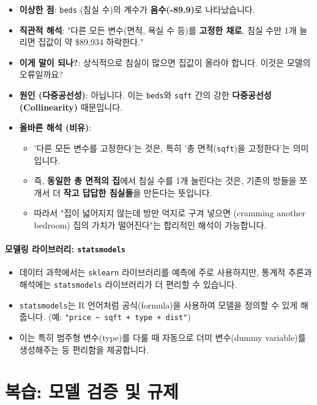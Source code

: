 \documentclass[11pt,a4paper]{book}
\theoremstyle{definition}
\begin{document}
\begin{itemize}
    \item \textbf{이상한 점}: \texttt{beds} (침실 수)의 계수가 \textbf{음수(-89.9)}로 나타났습니다.
    \item \textbf{직관적 해석}: "다른 모든 변수(면적, 욕실 수 등)를 \textbf{고정한 채로}, 침실 수만 1개 늘리면 집값이 약 \$89,934 하락한다."
    \item \textbf{이게 말이 되나?}: 상식적으로 침실이 많으면 집값이 올라야 합니다. 이것은 모델의 오류일까요?
    \item \textbf{원인 (다중공선성)}: 아닙니다. 이는 \texttt{beds}와 \texttt{sqft} 간의 강한 \textbf{다중공선성(Collinearity)} 때문입니다.
    \item \textbf{올바른 해석 (비유)}:
        \begin{itemize}
            \item '다른 모든 변수를 고정한다'는 것은, 특히 '총 면적(\texttt{sqft})을 고정한다'는 의미입니다.
            \item 즉, \textbf{동일한 총 면적의 집}에서 침실 수를 1개 늘린다는 것은, 기존의 방들을 쪼개서 더 \textbf{작고 답답한 침실들}을 만든다는 뜻입니다.
            \item 따라서 "집이 넓어지지 않는데 방만 억지로 구겨 넣으면 (cramming another bedroom) 집의 가치가 떨어진다"는 합리적인 해석이 가능합니다.
        \end{itemize}
\end{itemize}

\subsection{모델링 라이브러리: \texttt{statsmodels}}

\begin{itemize}
    \item 데이터 과학에서는 \texttt{sklearn} 라이브러리를 예측에 주로 사용하지만, 통계적 추론과 해석에는 \texttt{statsmodels} 라이브러리가 더 편리할 수 있습니다.
    \item \texttt{statsmodels}는 R 언어처럼 공식(formula)을 사용하여 모델을 정의할 수 있게 해줍니다. (예: \texttt{"price \textasciitilde{} sqft + type + dist"})
    \item 이는 특히 범주형 변수(type)를 다룰 때 자동으로 더미 변수(dummy variable)를 생성해주는 등 편리함을 제공합니다.
\end{itemize}


\part{복습: 모델 검증 및 규제}
\label{part:review}
\end{document}
